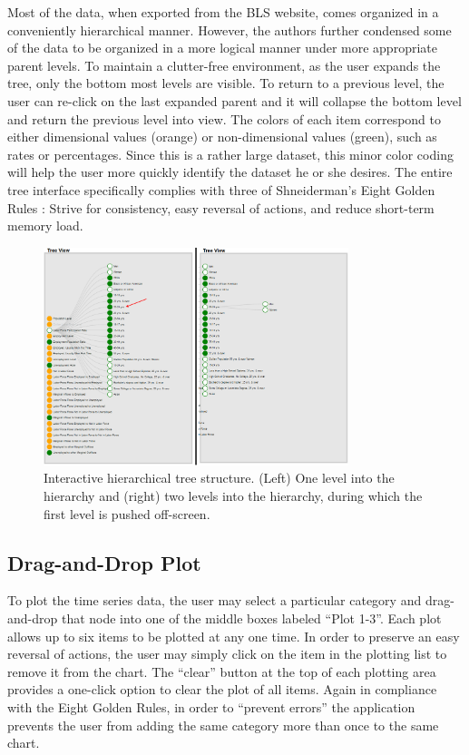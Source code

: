 \documentclass{sigchi}
\begin{document}
Most of the data, when exported from the BLS website, comes organized in a conveniently hierarchical manner. However, the authors further condensed some of the data to be organized in a more logical manner under more appropriate parent levels. To maintain a clutter-free environment, as the user expands the tree, only the bottom most levels are visible. To return to a previous level, the user can re-click on the last expanded parent and it will collapse the bottom level and return the previous level into view. The colors of each item correspond to either dimensional values (orange) or non-dimensional values (green), such as rates or percentages. Since this is a rather large dataset, this minor color coding will help the user more quickly identify the dataset he or she desires. The entire tree interface specifically complies with three of Shneiderman's Eight Golden Rules \cite{shneiderman_eight_????}: Strive for consistency, easy reversal of actions, and reduce short-term memory load.

\begin{figure}[t]
\centering
    \includegraphics[width = 3.5in]{figures/tree2.png}
    \caption{Interactive hierarchical tree structure. (Left) One level into the hierarchy and (right) two levels into the hierarchy, during which the first level is pushed off-screen.}
    \label{TreeStructure}
\end{figure}

\subsection{Drag-and-Drop Plot}

To plot the time series data, the user may select a particular category and drag-and-drop that node into one of the middle boxes labeled ``Plot 1-3''. Each plot allows up to six items to be plotted at any one time. In order to preserve an easy reversal of actions, the user may simply click on the item in the plotting list to remove it from the chart. The ``clear'' button at the top of each plotting area provides a one-click option to clear the plot of all items. Again in compliance with the Eight Golden Rules, in order to ``prevent errors'' the application prevents the user from adding the same category more than once to the same chart.
\end{document}
